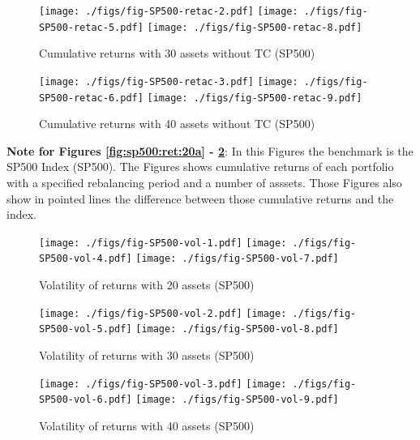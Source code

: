 \documentclass[preprint,authoryear,review,12pt]{elsarticle}
\begin{document}
\begin{figure}[htpb]
\centering
\caption{Cumulative returns with 30 assets without TC (SP500)}
\label{fig:sp500:ret:30a}
\texttt{[image: ./figs/fig-SP500-retac-2.pdf]}
\texttt{[image: ./figs/fig-SP500-retac-5.pdf]}
\texttt{[image: ./figs/fig-SP500-retac-8.pdf]}
\end{figure}

\begin{figure}[htpb]
\centering
\caption{Cumulative returns with 40 assets without TC (SP500)}
\label{fig:sp500:ret:40a}
\texttt{[image: ./figs/fig-SP500-retac-3.pdf]}
\texttt{[image: ./figs/fig-SP500-retac-6.pdf]}
\texttt{[image: ./figs/fig-SP500-retac-9.pdf]}
\end{figure}

{\footnotesize
\textbf{Note for Figures \ref{fig:sp500:ret:20a} - \ref{fig:sp500:ret:40a}}:
In this Figures the benchmark is the SP500 Index (SP500).
The Figures shows cumulative returns of each portfolio with a specified rebalancing period and a number of asssets.
Those Figures also show in pointed lines the difference between those cumulative returns and the index.}


\begin{figure}[htpb]
\centering
\caption{Volatility of returns with 20 assets (SP500)}
\label{fig:sp500:vol:20a}
\texttt{[image: ./figs/fig-SP500-vol-1.pdf]}
\texttt{[image: ./figs/fig-SP500-vol-4.pdf]}
\texttt{[image: ./figs/fig-SP500-vol-7.pdf]}

\end{figure}

\begin{figure}[htpb]
\centering
\caption{Volatility of returns with 30 assets (SP500)}
\label{fig:sp500:vol:30a}
\texttt{[image: ./figs/fig-SP500-vol-2.pdf]}
\texttt{[image: ./figs/fig-SP500-vol-5.pdf]}
\texttt{[image: ./figs/fig-SP500-vol-8.pdf]}
\end{figure}

\begin{figure}[htpb]
\centering
\caption{Volatility of returns with 40 assets (SP500)}
\label{fig:sp500:vol:40a}
\texttt{[image: ./figs/fig-SP500-vol-3.pdf]}
\texttt{[image: ./figs/fig-SP500-vol-6.pdf]}
\texttt{[image: ./figs/fig-SP500-vol-9.pdf]}
\end{figure}
\end{document}
